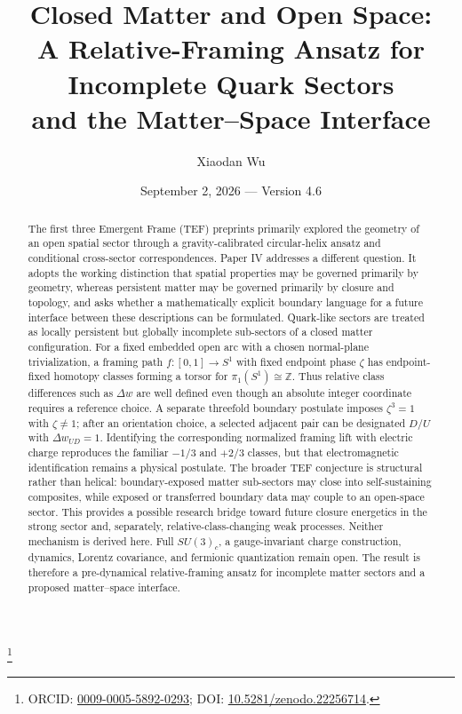 \documentclass[aps,prd,reprint,superscriptaddress,nofootinbib,longbibliography,floatfix]{revtex4-2}
\newcommand{\TEF}{\textsc{TEF}}
\begin{document}
\title{Closed Matter and Open Space:\\
A Relative-Framing Ansatz for Incomplete Quark Sectors\\
and the Matter--Space Interface}

\author{Xiaodan Wu}
\thanks{ORCID: \href{https://orcid.org/0009-0005-5892-0293}{0009-0005-5892-0293}; DOI: \href{https://doi.org/10.5281/zenodo.22256714}{10.5281/zenodo.22256714}.}

\date{September 2, 2026 --- Version 4.6}

\begin{abstract}
The first three Emergent Frame (\TEF{}) preprints primarily explored the geometry of an open spatial sector through a gravity-calibrated circular-helix ansatz and conditional cross-sector correspondences. Paper IV addresses a different question. It adopts the working distinction that spatial properties may be governed primarily by geometry, whereas persistent matter may be governed primarily by closure and topology, and asks whether a mathematically explicit boundary language for a future interface between these descriptions can be formulated. Quark-like sectors are treated as locally persistent but globally incomplete sub-sectors of a closed matter configuration. For a fixed embedded open arc with a chosen normal-plane trivialization, a framing path $f:[0,1]\to S^1$ with fixed endpoint phase $\zeta$ has endpoint-fixed homotopy classes forming a torsor for $\pi_1(S^1)\cong\mathbb Z$. Thus relative class differences such as $\Delta w$ are well defined even though an absolute integer coordinate requires a reference choice. A separate threefold boundary postulate imposes $\zeta^3=1$ with $\zeta\neq1$; after an orientation choice, a selected adjacent pair can be designated $D/U$ with $\Delta w_{UD}=1$. Identifying the corresponding normalized framing lift with electric charge reproduces the familiar $-1/3$ and $+2/3$ classes, but that electromagnetic identification remains a physical postulate. The broader TEF conjecture is structural rather than helical: boundary-exposed matter sub-sectors may close into self-sustaining composites, while exposed or transferred boundary data may couple to an open-space sector. This provides a possible research bridge toward future closure energetics in the strong sector and, separately, relative-class-changing weak processes. Neither mechanism is derived here. Full $SU(3)_c$, a gauge-invariant charge construction, dynamics, Lorentz covariance, and fermionic quantization remain open. The result is therefore a pre-dynamical relative-framing ansatz for incomplete matter sectors and a proposed matter--space interface.
\end{abstract}
\end{document}
